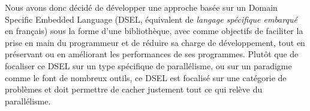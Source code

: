 Nous avons donc décidé de développer une approche basée sur un Domain Specific Embedded Language (DSEL, équivalent de \emph{langage spécifique embarqué} en français) sous la forme d'une bibliothèque, avec comme objectifs de faciliter la prise en main du programmeur et de réduire sa charge de développement, tout en préservant ou en améliorant les performances de ses programmes.
Plutôt que de focaliser ce DSEL sur un type spécifique de parallélisme, ou sur un paradigme comme le font de nombreux outils, ce DSEL est focalisé sur une catégorie de problèmes et doit permettre de cacher justement tout ce qui relève du parallélisme.




